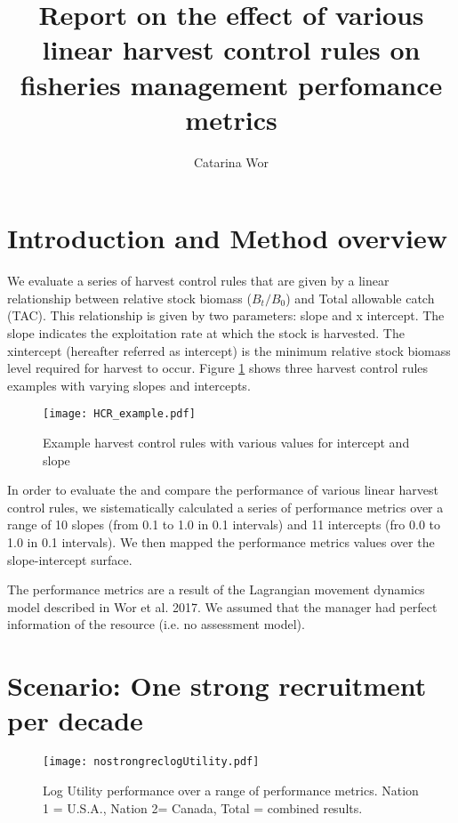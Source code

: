 \documentclass[a4paper]{article}
\title{Report on the effect of various linear harvest control rules on fisheries management perfomance metrics}
\author{Catarina Wor}
\begin{document}
\maketitle \large

\section{Introduction and Method overview}
 
We evaluate a series of harvest control rules that are given by a linear relationship between relative stock biomass ($B_t/B_0$) and Total allowable catch (TAC). This relationship is given by two parameters: slope and  x intercept. The slope indicates the exploitation rate at which the stock is harvested. The xintercept (hereafter referred as intercept) is the minimum relative stock biomass level required for harvest to occur. Figure \ref{examplehcr} shows three harvest control  rules examples with varying slopes and intercepts.


\begin{center} %
\begin{figure}[H]
\centering 
    \label{examplehcr}             
    \texttt{[image: HCR\_example.pdf]}  
    \caption{ Example harvest control rules with various values for intercept and slope}                
\end{figure}
\end{center}


In order to evaluate the and compare the performance of various linear harvest control rules, we sistematically calculated a series of performance metrics over a range of 10 slopes (from 0.1 to 1.0 in 0.1 intervals) and 11 intercepts (fro 0.0 to 1.0 in 0.1 intervals). We then mapped the performance metrics values over the slope-intercept surface. 

The performance metrics are a result of the Lagrangian movement dynamics model described in Wor et al. 2017. We assumed that the manager had perfect information of the resource (i.e. no assessment model). 



\section{Scenario: One strong recruitment per decade}


\begin{center} %
\begin{figure}[H]   
\large           
    \texttt{[image: nostrongreclogUtility.pdf]}  
	\caption{ Log Utility performance over a range of performance metrics. Nation 1 = U.S.A., Nation 2= Canada, Total =  combined results.}                
\end{figure}
\end{center}
\end{document}

